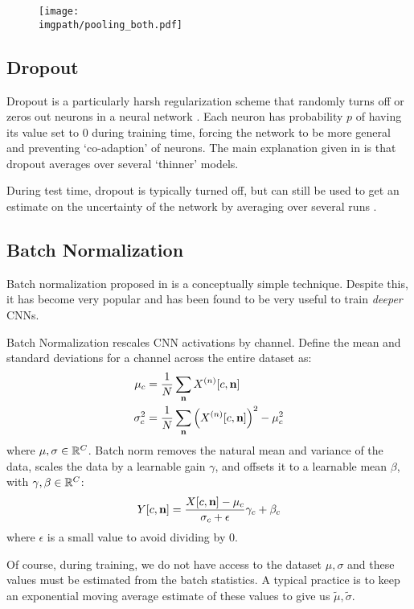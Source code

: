 \begin{figure}
  \centering
  \texttt{[image: \\imgpath/pooling\_both.pdf]}
  \label{fig:ch2:maxpool}
\end{figure}

\subsection{Dropout}
Dropout is a particularly harsh regularization scheme that randomly turns off
or zeros out neurons in a neural network \cite{hinton_improving_2012, srivastava_dropout:_2014}.
Each neuron has probability $p$ of having its value set to 0 during training
time, forcing the network to be more general and preventing `co-adaption' of
neurons. The main explanation given in \cite{srivastava_dropout:_2014} is
that dropout averages over several `thinner' models.

During test time, dropout is typically turned off, but can still be
used to get an estimate on the uncertainty of the network by averaging over
several runs \cite{gal_dropout_2016}.

\subsection{Batch Normalization}
Batch normalization proposed in \cite{ioffe_batch_2015} is a conceptually 
simple technique. Despite this, it has become very popular and has been found
to be very useful to train \emph{deeper} CNNs. 

Batch Normalization rescales CNN activations by channel. Define the mean
and standard deviations for a channel across the entire dataset as:
\begin{align}
  \mu_c &= \frac{1}{N} \sum_\nn X^{(n)}[c, \nn] \\
  \sigma_c^2 &=  \frac{1}{N} \sum_\nn \left(X^{(n)}[c, \nn]\right)^2 - \mu^2_c 
\end{align}
where $\mu, \sigma \in \reals[C]$.
Batch norm removes the natural mean and variance of the data, scales the data
by a learnable gain $\gamma$, and offsets it to a learnable mean $\beta$,
with $\gamma, \beta \in \reals[C]$:
\begin{equation}
  Y[c, \nn] = \frac{X[c, \nn] - \mu_c}{\sigma_c + \epsilon}\gamma_c + \beta_c
\end{equation}
where $\epsilon$ is a small value to avoid dividing by 0.

Of course, during training, we do not have access to the dataset $\mu, \sigma$
and these values must be estimated from the batch statistics. A typical practice
is to keep an exponential moving average estimate of these values to give us
$\tilde{\mu}, \tilde{\sigma}$. 

